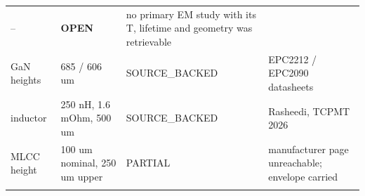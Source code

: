 \documentclass[10pt,]{article}
\begin{document}
\begin{longtable}[]{@{}llll@{}}
\begin{minipage}[t]{0.22\columnwidth}
--\strut
\end{minipage} & \begin{minipage}[t]{0.22\columnwidth}\raggedright
\textbf{OPEN}\strut
\end{minipage} & \begin{minipage}[t]{0.22\columnwidth}\raggedright
no primary EM study with its T, lifetime and geometry was
retrievable\strut
\end{minipage}\tabularnewline
\begin{minipage}[t]{0.22\columnwidth}\raggedright
GaN heights\strut
\end{minipage} & \begin{minipage}[t]{0.22\columnwidth}\raggedright
685 / 606 um\strut
\end{minipage} & \begin{minipage}[t]{0.22\columnwidth}\raggedright
SOURCE\_BACKED\strut
\end{minipage} & \begin{minipage}[t]{0.22\columnwidth}\raggedright
EPC2212 / EPC2090 datasheets\strut
\end{minipage}\tabularnewline
\begin{minipage}[t]{0.22\columnwidth}\raggedright
inductor\strut
\end{minipage} & \begin{minipage}[t]{0.22\columnwidth}\raggedright
250 nH, 1.6 mOhm, 500 um\strut
\end{minipage} & \begin{minipage}[t]{0.22\columnwidth}\raggedright
SOURCE\_BACKED\strut
\end{minipage} & \begin{minipage}[t]{0.22\columnwidth}\raggedright
Rasheedi, TCPMT 2026\strut
\end{minipage}\tabularnewline
\begin{minipage}[t]{0.22\columnwidth}\raggedright
MLCC height\strut
\end{minipage} & \begin{minipage}[t]{0.22\columnwidth}\raggedright
100 um nominal, 250 um upper\strut
\end{minipage} & \begin{minipage}[t]{0.22\columnwidth}\raggedright
PARTIAL\strut
\end{minipage} & \begin{minipage}[t]{0.22\columnwidth}\raggedright
manufacturer page unreachable; envelope carried\strut
\end{minipage}\tabularnewline
\begin{minipage}[t]{0.22\columnwidth}\raggedright

\end{minipage}
\end{longtable}
\end{document}
